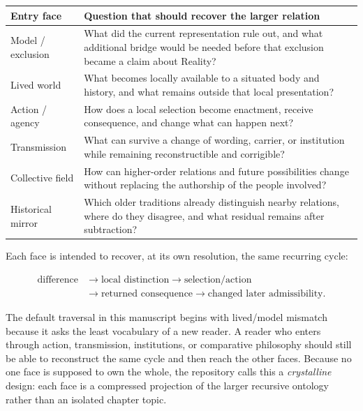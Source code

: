 \documentclass[11pt]{article}
\begin{document}
\begin{center}
\begin{tabularx}{0.96\textwidth}{lX}
\toprule
Entry face & Question that should recover the larger relation \\
\midrule
Model / exclusion & What did the current representation rule out, and what additional bridge would be needed before that exclusion became a claim about Reality? \\
Lived world & What becomes locally available to a situated body and history, and what remains outside that local presentation? \\
Action / agency & How does a local selection become enactment, receive consequence, and change what can happen next? \\
Transmission & What can survive a change of wording, carrier, or institution while remaining reconstructible and corrigible? \\
Collective field & How can higher-order relations and future possibilities change without replacing the authorship of the people involved? \\
Historical mirror & Which older traditions already distinguish nearby relations, where do they disagree, and what residual remains after subtraction? \\
\bottomrule
\end{tabularx}
\end{center}

Each face is intended to recover, at its own resolution, the same recurring cycle:

\begin{equation}
\begin{aligned}
\text{difference}&\rightarrow\text{local distinction}\rightarrow\text{selection/action}\\
&\rightarrow\text{returned consequence}\rightarrow\text{changed later admissibility}.
\end{aligned}
\end{equation}

The default traversal in this manuscript begins with lived/model mismatch because it asks the least vocabulary of a new reader. A reader who enters through action, transmission, institutions, or comparative philosophy should still be able to reconstruct the same cycle and then reach the other faces. Because no one face is supposed to own the whole, the repository calls this a \emph{crystalline} design: each face is a compressed projection of the larger recursive ontology rather than an isolated chapter topic.
\end{document}
